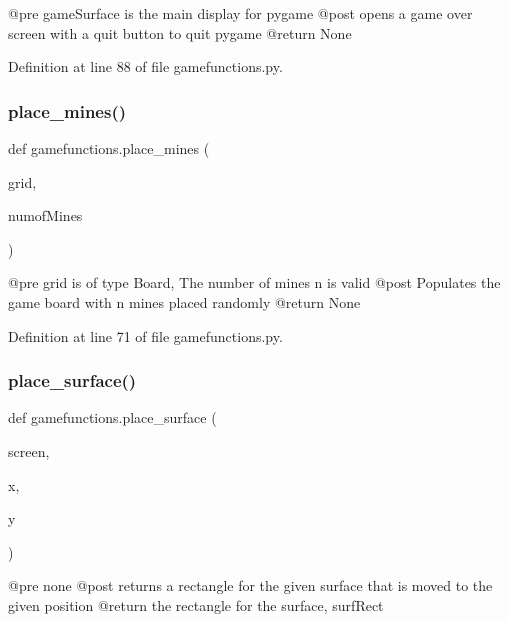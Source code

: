 \begin{DoxyVerb}@pre    gameSurface is the main display for pygame
    @post   opens a game over screen with a quit button to quit pygame
    @return None
\end{DoxyVerb}
 

Definition at line 88 of file gamefunctions.\+py.

\mbox{\label{namespacegamefunctions_acf46cabff90f0d1e06c4aadc3865292a}} 
\subsubsection{\texorpdfstring{place\+\_\+mines()}{place\_mines()}}
{\footnotesize\ttfamily def gamefunctions.\+place\+\_\+mines (\begin{DoxyParamCaption}\item[{}]{grid,  }\item[{}]{numof\+Mines }\end{DoxyParamCaption})}

\begin{DoxyVerb}@pre    grid is of type Board, The number of mines n is valid
    @post   Populates the game board with n mines placed randomly
    @return None
\end{DoxyVerb}
 

Definition at line 71 of file gamefunctions.\+py.

\mbox{\label{namespacegamefunctions_a109b9daf1366f60cec625c3ff29fd7dd}} 
\subsubsection{\texorpdfstring{place\+\_\+surface()}{place\_surface()}}
{\footnotesize\ttfamily def gamefunctions.\+place\+\_\+surface (\begin{DoxyParamCaption}\item[{}]{screen,  }\item[{}]{x,  }\item[{}]{y }\end{DoxyParamCaption})}

\begin{DoxyVerb}@pre    none
    @post   returns a rectangle for the given surface that is moved to the given position
    @return the rectangle for the surface, surfRect
\end{DoxyVerb}
 

